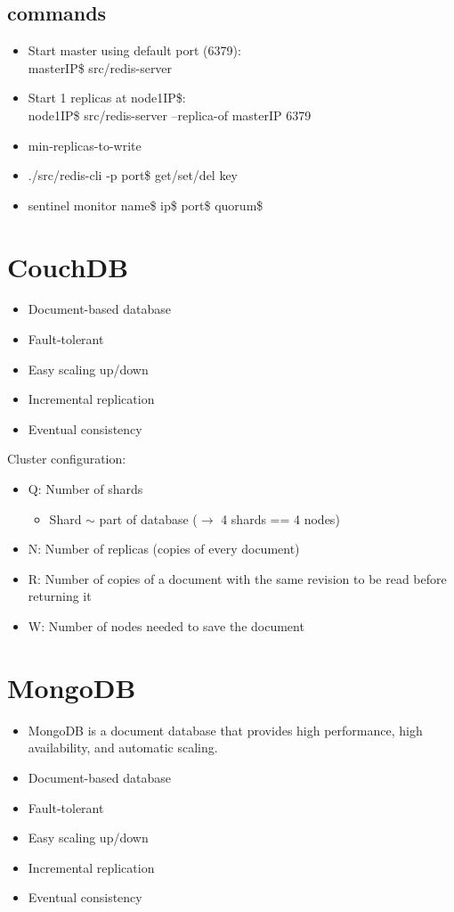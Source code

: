 \subsection{commands}
\begin{itemize}
    \item Start master using default port (6379):\\
masterIP\$ src/redis-server 
\item Start 1 replicas at node1IP\$: \\
node1IP\$ src/redis-server --replica-of masterIP 6379 
\item min-replicas-to-write
\item ./src/redis-cli -p port\$ get/set/del key
\item sentinel monitor name\$ ip\$ port\$ quorum\$
\end{itemize}

\section{CouchDB}
\begin{itemize}
  \item Document-based database
  \item Fault-tolerant
  \item Easy scaling up/down
  \item Incremental replication
  \item Eventual consistency
\end{itemize}
Cluster configuration:
  \begin{itemize}
    \item Q: Number of shards
    \begin{itemize}
      \item Shard $\sim$ part of database ($\rightarrow$ 4 shards == 4 nodes)
    \end{itemize}
    \item N: Number of replicas (copies of every document)
    \item R: Number of copies of a document with the same revision to be read before returning it
    \item W: Number of nodes needed to save the document
  \end{itemize}


\section{MongoDB}
\begin{itemize}
  \item MongoDB is a document database that provides high performance, high availability, and automatic scaling.
  \item Document-based database
  \item Fault-tolerant
  \item Easy scaling up/down
  \item Incremental replication
  \item Eventual consistency
\end{itemize}

